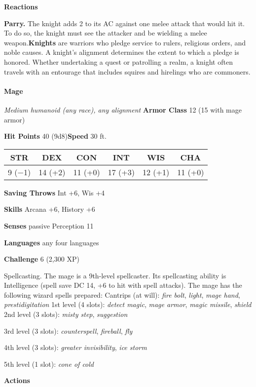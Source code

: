 \documentclass[
]{article}
\begin{document}
\textbf{Reactions}

\textbf{Parry.} The knight adds 2 to its AC against one melee attack
that would hit it. To do so, the knight must see the attacker and be
wielding a melee weapon.\textbf{Knights} are warriors who pledge service
to rulers, religious orders, and noble causes. A knight's alignment
determines the extent to which a pledge is honored. Whether undertaking
a quest or patrolling a realm, a knight often travels with an entourage
that includes squires and hirelings who are commoners.

\hypertarget{mage}{%
\paragraph{Mage}\label{mage}}

\emph{Medium humanoid (any race), any alignment} \textbf{Armor Class} 12
(15 with mage armor)

\textbf{Hit Points} 40 (9d8)\textbf{Speed} 30 ft.

\begin{longtable}[]{@{}cccccc@{}}
\toprule
STR & DEX & CON & INT & WIS & CHA\tabularnewline
\midrule
\endhead
9 (−1) & 14 (+2) & 11 (+0) & 17 (+3) & 12 (+1) & 11 (+0)\tabularnewline
\bottomrule
\end{longtable}

\textbf{Saving Throws} Int +6, Wis +4

\textbf{Skills} Arcana +6, History +6

\textbf{Senses} passive Perception 11

\textbf{Languages} any four languages

\textbf{Challenge} 6 (2,300 XP)

Spellcasting. The mage is a 9th-level spellcaster. Its spellcasting
ability is Intelligence (spell save DC 14, +6 to hit with spell
attacks). The mage has the following wizard spells prepared: Cantrips
(at will): \emph{fire bolt}, \emph{light}, \emph{mage hand},
\emph{prestidigitation} 1st level (4 slots): \emph{detect magic},
\emph{mage armor}, \emph{magic missile}, \emph{shield} 2nd level (3
slots): \emph{misty step}, \emph{suggestion}

3rd level (3 slots): \emph{counterspell}, \emph{fireball}, \emph{fly}

4th level (3 slots): \emph{greater invisibility}, \emph{ice storm}

5th level (1 slot): \emph{cone of cold}

\textbf{Actions}
\end{document}
